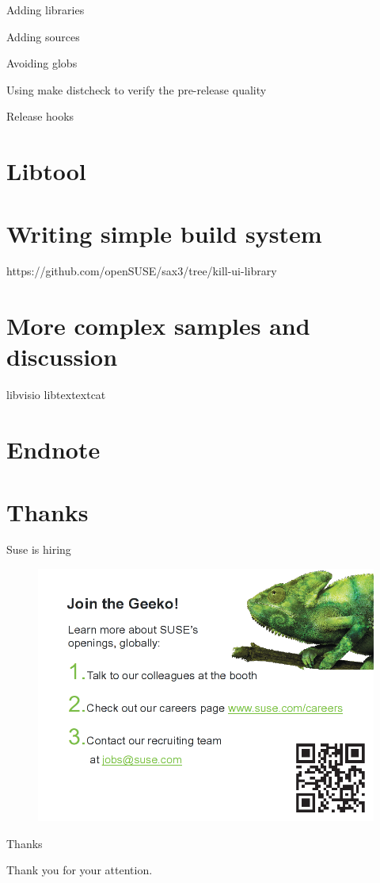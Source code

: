 \documentclass{beamer}
\begin{document}
Adding libraries

Adding sources

Avoiding globs

Using make distcheck to verify the pre-release quality

Release hooks

\section{Libtool}

\section{Writing simple build system}
https://github.com/openSUSE/sax3/tree/kill-ui-library

\section{More complex samples and discussion}
libvisio
libtextextcat

\section{Endnote}

\section{Thanks}

\begin{frame}{Suse is hiring}
	\begin{figure}
	\includegraphics[width= 0.8\linewidth]{suse_hiring.png}
	\end{figure}
\end{frame}

\begin{frame}{Thanks}
	\begin{center}
	Thank you for your attention.
	\end{center}
\end{frame}
\end{document}
